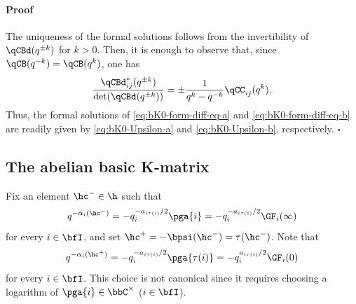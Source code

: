 \documentclass[reqno]{amsart}
\numberwithin{equation}{section}
\newenvironment{pf}{\medskip\paragraph{{\sc Proof}}}{\hfill$\square$\par\medskip}
\begin{document}
\begin{pf}
The uniqueness of the formal solutions follows from the invertibility of
$\qCBd(q^{\pm k})$ for $k>0$. Then, it is enough to observe that,
since $\qCB(q^{-k})=\qCB(q^k)$, one has
\begin{equation}\label{eq:bK0-adjugate-ratio}
	\frac{\qCBd^*_{ij}(q^{\pm k})}
	{\det(\qCBd(q^{\pm k}))}
	=
	\pm\frac{1}{q^k-q^{-k}}\qCC_{ij}(q^k).
\end{equation}
Thus, the formal solutions of \eqref{eq:bK0-form-diff-eq-a} and  \eqref{eq:bK0-form-diff-eq-b} are readily given by \eqref{eq:bK0-Upsilon-a} and \eqref{eq:bK0-Upsilon-b}, respectively.
\end{pf}

\subsection{The abelian basic K-matrix}\label{ss:bK0-form-thm}
Fix an element $\hc^-\in\h$ such that
\begin{equation}\label{eq:bK0-H-minus}
q^{-\alpha_i(\hc^-)}=-q_i^{-a_{i\tau(i)}/2}\pga{i}=-q_i^{-a_{i\tau(i)}/2}\GF_i(\infty)
\end{equation}
for every $i\in\bfI$, and set
$\hc^+=-\bpsi(\hc^-)=\tau(\hc^-)$. Note that
\begin{equation}\label{eq:bK0-H-plus}
q^{-\alpha_i(\hc^+)}
=-q_i^{-a_{i\tau(i)}/2}\pga{\tau(i)}
=-q_i^{a_{i\tau(i)}/2}\GF_i(0)
\end{equation}
for every $i\in\bfI$. This choice is not canonical since it requires choosing a
logarithm of $\pga{i}\in\bbC^\times$ ($i\in\bfI$).
\end{document}
